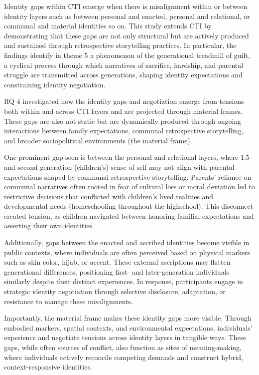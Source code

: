 Identity gaps within CTI emerge when there is misalignment within or between identity layers such as between personal and enacted, personal and relational, or communal and material identities so on. This study extends CTI by demonstrating that these gaps are not only structural but are actively produced and sustained through retrospective storytelling practices. In particular, the findings identify in theme 5 a phenomenon of the generational treadmill of guilt, a cyclical process through which narratives of sacrifice, hardship, and parental struggle are transmitted across generations, shaping identity expectations and constraining identity negotiation. 

RQ 4 investigated how the identity gaps and negotiation emerge from tensions both within and across CTI layers and are projected through material frames. These gaps are also not static but are dynamically produced through ongoing interactions between family expectations, communal retrospective storytelling, and broader sociopolitical environments (the material frame).

One prominent gap seen is between the personal and relational layers, where 1.5 and second-generation (children's) sense of self may not align with parental expectations shaped by communal retrospective storytelling. Parents’ reliance on communal narratives often rooted in fear of cultural loss or moral deviation led to restrictive decisions that conflicted with children's lived realities and developmental needs (homeschooling throughout the highschool). This disconnect created tension, as children navigated between honoring familial expectations and asserting their own identities.

Additionally, gaps between the enacted and ascribed identities become visible in public contexts, where individuals are often perceived based on physical markers such as skin color, hijab, or accent. These external ascriptions may flatten generational differences, positioning first- and later-generation individuals similarly despite their distinct experiences. In response, participants engage in strategic identity negotiation through selective disclosure, adaptation, or resistance to manage these misalignments.

Importantly, the material frame makes these identity gaps more visible. Through embodied markers, spatial contexts, and environmental expectations, individuals' experience and negotiate tensions across identity layers in tangible ways. These gaps, while often sources of conflict, also function as sites of meaning-making, where individuals actively reconcile competing demands and construct hybrid, context-responsive identities.

